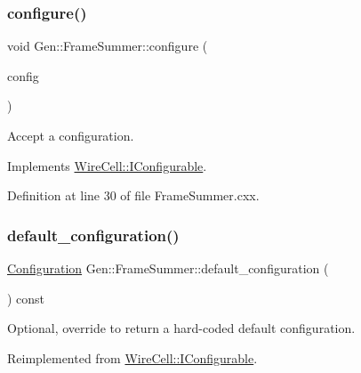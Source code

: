 \subsubsection{\texorpdfstring{configure()}{configure()}}
{\footnotesize\ttfamily void Gen\+::\+Frame\+Summer\+::configure (\begin{DoxyParamCaption}\item[{const \hyperlink{namespace_wire_cell_a9f705541fc1d46c608b3d32c182333ee}{Wire\+Cell\+::\+Configuration} \&}]{config }\end{DoxyParamCaption})\hspace{0.3cm}{\ttfamily [virtual]}}



Accept a configuration. 



Implements \hyperlink{class_wire_cell_1_1_i_configurable_a57ff687923a724093df3de59c6ff237d}{Wire\+Cell\+::\+I\+Configurable}.



Definition at line 30 of file Frame\+Summer.\+cxx.

\mbox{\label{class_wire_cell_1_1_gen_1_1_frame_summer_ac811b308e2f01644e04401aa3982f583}} 
\subsubsection{\texorpdfstring{default\+\_\+configuration()}{default\_configuration()}}
{\footnotesize\ttfamily \hyperlink{namespace_wire_cell_a9f705541fc1d46c608b3d32c182333ee}{Configuration} Gen\+::\+Frame\+Summer\+::default\+\_\+configuration (\begin{DoxyParamCaption}{ }\end{DoxyParamCaption}) const\hspace{0.3cm}{\ttfamily [virtual]}}



Optional, override to return a hard-\/coded default configuration. 



Reimplemented from \hyperlink{class_wire_cell_1_1_i_configurable_a54841b2da3d1ea02189478bff96f7998}{Wire\+Cell\+::\+I\+Configurable}.



